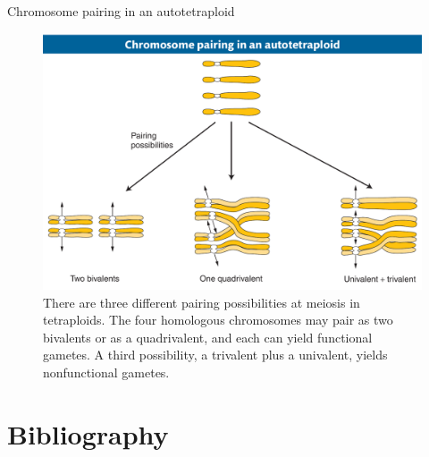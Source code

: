\documentclass[11pt,ignorenonframetext,aspectratio=169]{beamer}
\begin{document}
\begin{frame}{Chromosome pairing in an autotetraploid}
\protect\hypertarget{chromosome-pairing-in-an-autotetraploid}{}
\begin{figure}
\includegraphics[width=0.65\linewidth]{../images/autotetraploid_chromosome_pairing} \caption{There are three different pairing possibilities at meiosis in tetraploids. The four homologous chromosomes may pair as two bivalents or as a quadrivalent, and each can yield functional gametes. A third possibility, a trivalent plus a univalent, yields nonfunctional gametes.}\label{fig:autotetraploid-chromosome-pairing}
\end{figure}
\end{frame}

\hypertarget{bibliography}{%
\section{Bibliography}\label{bibliography}}

\begin{frame}{}
\protect\hypertarget{section-13}{}
\end{frame}
\end{document}

